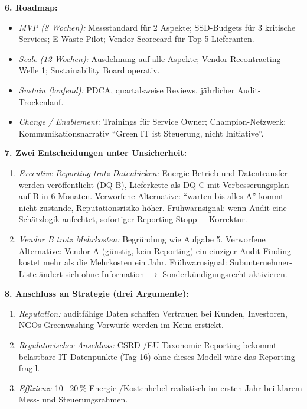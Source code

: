 \documentclass[11pt,a4paper,oneside]{article}
\begin{document}
\begin{loesungbox}
\smallskip
\textbf{6. Roadmap:}
\begin{itemize}
  \item \emph{MVP (8 Wochen):} Messstandard f\"ur 2 Aspekte; SSD-Budgets f\"ur 3 kritische Services; E-Waste-Pilot; Vendor-Scorecard f\"ur Top-5-Lieferanten.
  \item \emph{Scale (12 Wochen):} Ausdehnung auf alle Aspekte; Vendor-Recontracting Welle 1; Sustainability Board operativ.
  \item \emph{Sustain (laufend):} PDCA, quartalsweise Reviews, j\"ahrlicher Audit-Trockenlauf.
  \item \emph{Change / Enablement:} Trainings f\"ur Service Owner; Champion-Netzwerk; Kommunikationsnarrativ ``Green IT ist Steuerung, nicht Initiative''.
\end{itemize}

\smallskip
\textbf{7. Zwei Entscheidungen unter Unsicherheit:}
\begin{enumerate}
  \item \emph{Executive Reporting trotz Datenl\"ucken:} Energie Betrieb und Datentransfer werden ver\"offentlicht (DQ B), Lieferkette als DQ C mit Verbesserungsplan auf B in 6 Monaten. Verworfene Alternative: ``warten bis alles A'' \textendash{} kommt nicht zustande, Reputationsrisiko h\"oher. Fr\"uhwarnsignal: wenn Audit eine Sch\"atzlogik anfechtet, sofortiger Reporting-Stopp + Korrektur.
  \item \emph{Vendor B trotz Mehrkosten:} Begr\"undung wie Aufgabe 5. Verworfene Alternative: Vendor A (g\"unstig, kein Reporting) \textendash{} ein einziger Audit-Finding kostet mehr als die Mehrkosten ein Jahr. Fr\"uhwarnsignal: Subunternehmer-Liste \"andert sich ohne Information $\rightarrow$ Sonderk\"undigungsrecht aktivieren.
\end{enumerate}

\smallskip
\textbf{8. Anschluss an Strategie (drei Argumente):}
\begin{enumerate}
  \item \emph{Reputation:} auditf\"ahige Daten schaffen Vertrauen bei Kunden, Investoren, NGOs \textendash{} Greenwashing-Vorw\"urfe werden im Keim erstickt.
  \item \emph{Regulatorischer Anschluss:} CSRD-/EU-Taxonomie-Reporting bekommt belastbare IT-Datenpunkte (Tag 16) \textendash{} ohne dieses Modell w\"are das Reporting fragil.
  \item \emph{Effizienz:} 10\,--\,20\,\% Energie-/Kostenhebel realistisch im ersten Jahr bei klarem Mess- und Steuerungsrahmen.
\end{enumerate}
\end{loesungbox}
\end{document}
